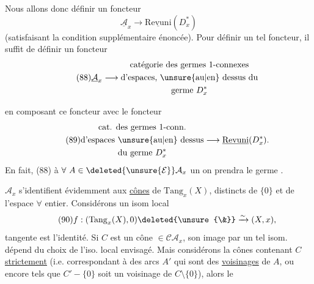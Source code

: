Nous allons donc définir un foncteur
\[
\tag{87}
\underline{\mathcal A}_x \longrightarrow
\underline{\mathrm{Revuni}}(D_x^*)
\]
 (satisfaisant la condition supplémentaire énoncée).
Pour définir un tel foncteur, il suffit de définir un foncteur
\[
\tag{88}
\underline{\mathcal A}_x \longrightarrow
\begin{gathered}
\text{catégorie des germes 1-connexes}\\
\text{d'espaces, \unsure{au|en} dessus du}\\
\text{germe }D_x^*
\end{gathered}
\]

en composant ce foncteur avec le foncteur
\[
\tag{89}
\begin{gathered}
\text{cat. des germes 1-conn.}\\
\text{d'espaces \unsure{au|en} dessus}\\
\text{du germe }D_x^*
\end{gathered}
\longrightarrow \underline{\mathrm{Revuni}}(D_x^*).
\]
En fait, (88)  à $\forall\ A\in
\deleted{\unsure{\mathcal E}}\mathcal A_x$ un
on prendra le germe .

$\mathcal A_x$ s'identifient évidemment aux \uline{cônes}
de $\mathrm{Tang}_x(X)$, 
distincts de $\{0\}$ et de l'espace
 $\forall$ entier.
Considérons un isom local
\[
\tag{90}
f:(\mathrm{Tang}_x(X),0)\deleted{\unsure{\&}}
\xrightarrow{\sim}(X,x),
\]
 tangente est l'identité.
 Si $C$ est un cône $\in\mathcal C\mathcal A_x$,
son image par un tel isom. dépend du choix de l'iso. local envisagé.
Mais considérons la 
 cônes
 contenant
\deleted{$\unsure{\in}$} $C$ \uline{strictement}
(i.e. correspondant à des arcs $A'$ qui sont des \uline{voisinages}
de $A$, ou encore tels que $C'-\{0\}$ soit un voisinage de
$C\setminus\{0\}$), alors le

